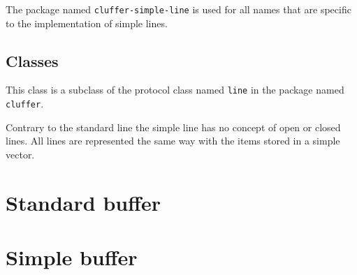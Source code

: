 The package named \texttt{cluffer-simple-line} is used for all names
that are specific to the implementation of simple lines.

\subsection{Classes}


This class is a subclass of the protocol class named \texttt{line} in
the package named \texttt{cluffer}.

Contrary to the standard line  the simple
line has no concept of open or closed lines.  All lines are
represented the same way with the items stored in a simple
\commonlisp{} vector.

\section{Standard buffer}

\section{Simple buffer}
